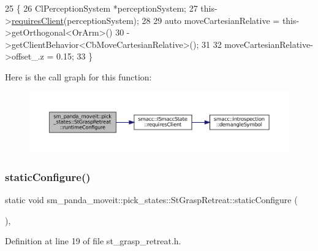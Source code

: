 \begin{DoxyCode}
25     \{
26         ClPerceptionSystem *perceptionSystem;
27         this->\hyperlink{classsmacc_1_1ISmaccState_a7f95c9f0a6ea2d6f18d1aec0519de4ac}{requiresClient}(perceptionSystem);
28 
29         \textcolor{keyword}{auto} moveCartesianRelative = this->getOrthogonal<OrArm>()
30                                          ->getClientBehavior<CbMoveCartesianRelative>();
31 
32         moveCartesianRelative->offset\_.z = 0.15;
33     \}
\end{DoxyCode}
Here is the call graph for this function\+:
\nopagebreak
\begin{figure}[H]
\begin{center}
\leavevmode
\includegraphics[width=350pt]{structsm__panda__moveit_1_1pick__states_1_1StGraspRetreat_a43ef62f4853ef238fbdc6b1f8a501795_cgraph}
\end{center}
\end{figure}
\mbox{\label{structsm__panda__moveit_1_1pick__states_1_1StGraspRetreat_a955fabf7ca574e03e9c9ff8c0b757a6a}} 
\subsubsection{\texorpdfstring{static\+Configure()}{staticConfigure()}}
{\footnotesize\ttfamily static void sm\+\_\+panda\+\_\+moveit\+::pick\+\_\+states\+::\+St\+Grasp\+Retreat\+::static\+Configure (\begin{DoxyParamCaption}{ }\end{DoxyParamCaption})\hspace{0.3cm}{\ttfamily [inline]}, {\ttfamily [static]}}



Definition at line 19 of file st\+\_\+grasp\+\_\+retreat.\+h.


